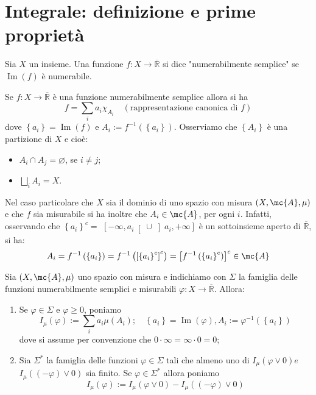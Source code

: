 \section{Integrale: definizione e prime proprietà}

\begin{boxdef}
  Sia $X$ un insieme. Una funzione $f: X \rightarrow \overline{\mathbb{R}}$ si dice "numerabilmente semplice" se $\operatorname{Im}(f)$ è numerabile.
\end{boxdef}

\begin{oss}
  Se $f: X \rightarrow \overline{\mathbb{R}}$ è una funzione numerabilmente semplice allora si ha
  \[
  f=\sum_{i} a_{i} \chi_{A_{i}} \quad(\text{rappresentazione canonica di } f)
  \]
  dove $\left\{a_{i}\right\}=\operatorname{Im}(f)$ e $A_{i}:=f^{-1}\left(\left\{a_{i}\right\}\right)$. Osserviamo che $\left\{A_{i}\right\}$ è una partizione di $X$ e cioè:
  \begin{itemize}
    \item $A_{i} \cap A_{j}=\varnothing$, se $i \neq j$;
  
    \item $\bigsqcup_{i} A_{i}=X$.
  \end{itemize}
  Nel caso particolare che $X$ sia il dominio di uno spazio con misura $(X, \mc{A}, \mu)$ e che $f$ sia misurabile si ha inoltre che $A_{i} \in \mc{A}$, per ogni $i$. Infatti, osservando che $\left\{a_{i}\right\}^{c}=$ $\left[-\infty, a_{i}\right[ \cup\left]a_{i},+\infty\right]$ è un sottoinsieme aperto di $\overline{\mathbb{R}}$, si ha:
  \[
  A_{i}=f^{-1}\left(\left\{a_{i}\right\}\right)=f^{-1}\left(\left[\left\{a_{i}\right\}^{c}\right]^{c}\right)=\left[f^{-1}\left(\left\{a_{i}\right\}^{c}\right)\right]^{c} \in \mc{A}
  \]
\end{oss}

\begin{boxdef}
    Sia $(X, \mc{A}, \mu)$ uno spazio con misura e indichiamo con $\Sigma$ la famiglia delle funzioni numerabilmente semplici e misurabili $\varphi: X \rightarrow \overline{\mathbb{R}}$. Allora:
    \begin{enumerate}[label = $(\roman*)$]
    \item Se $\varphi \in \Sigma$ e $\varphi \geq 0$, poniamo
    \[
    I_{\mu}(\varphi):=\sum_{i} a_{i} \mu\left(A_{i}\right) ; \quad\left\{a_{i}\right\}=\operatorname{Im}(\varphi), A_{i}:=\varphi^{-1}\left(\left\{a_{i}\right\}\right)
    \]
    dove si assume per convenzione che $0 \cdot \infty=\infty \cdot 0=0$;
    \item Sia $\Sigma^{*}$ la famiglia delle funzioni $\varphi \in \Sigma$ tali che almeno uno di $I_{\mu}(\varphi \vee 0) e$ $I_{\mu}((-\varphi) \vee 0)$ sia finito. Se $\varphi \in \Sigma^{*}$ allora poniamo
    \[
    I_{\mu}(\varphi):=I_{\mu}(\varphi \vee 0)-I_{\mu}((-\varphi) \vee 0)
    \]
    \end{enumerate}
\end{boxdef}

